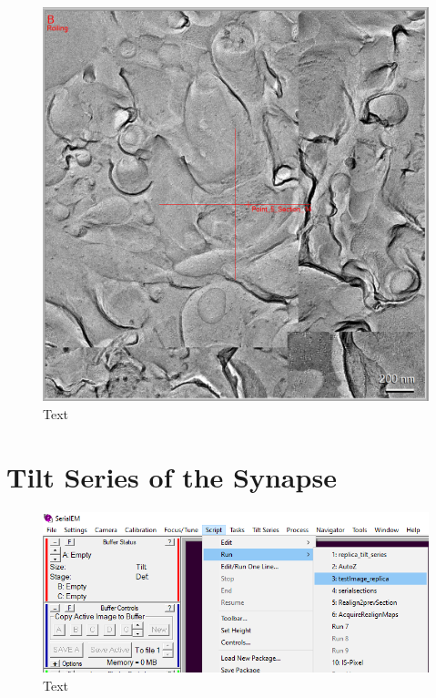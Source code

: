 \documentclass[12pt, a4paper]{scrartcl}
\begin{document}
\begin{figure}[H]
\includegraphics[width=\linewidth]{screenshots/MapWithPointZoom.png}
\caption{Text}
\end{figure}

\section{Tilt Series of the Synapse}

\begin{figure}[H]
\includegraphics[width=\linewidth]{screenshots/Script_Run.png}
\caption{Text}
\end{figure}
\end{document}

